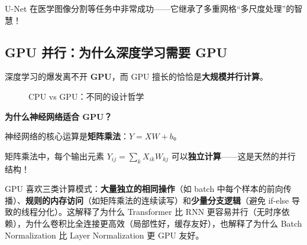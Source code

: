 U-Net 在医学图像分割等任务中非常成功——它继承了多重网格``多尺度处理''的智慧！

\subsection*{GPU 并行：为什么深度学习需要 GPU}

深度学习的爆发离不开 \textbf{GPU}，而 GPU 擅长的恰恰是\textbf{大规模并行计算}。

\begin{figure}[htbp]
\centering
{}
\caption{CPU vs GPU：不同的设计哲学}
\end{figure}

\textbf{为什么神经网络适合 GPU？}

神经网络的核心运算是\textbf{矩阵乘法}：$Y = XW + b$。

矩阵乘法中，每个输出元素 $Y_{ij} = \sum_k X_{ik} W_{kj}$ 可以\textbf{独立计算}——这是天然的并行结构！

\begin{insightbox}[title=GPU 友好的计算模式]
GPU 喜欢三类计算模式：\textbf{大量独立的相同操作}（如 batch 中每个样本的前向传播）、\textbf{规则的内存访问}（如矩阵乘法的连续读写）和\textbf{少量分支逻辑}（避免 if-else 导致的线程分化）。这解释了为什么 Transformer 比 RNN 更容易并行（无时序依赖），为什么卷积比全连接更高效（局部性好，缓存友好），也解释了为什么 Batch Normalization 比 Layer Normalization 更 GPU 友好。
\end{insightbox}


